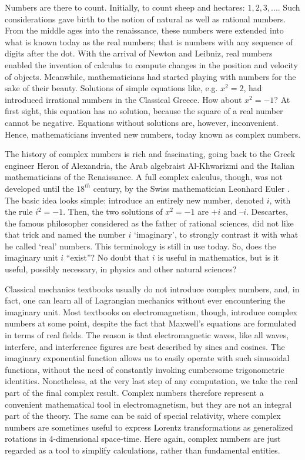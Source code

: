 \documentclass[onecolumn,prx,amsmath,amssymb,12pt]{revtex4-2}
\begin{document}
\newpage

Numbers are there to count. Initially, to count sheep and hectares: $1,2,3,...$. Such considerations gave birth to the notion of natural as well as rational numbers. From the middle ages into the renaissance, these numbers were extended into what is known today as the real numbers; that is numbers with any sequence of digits after the dot. With the arrival of Newton and Leibniz, real numbers enabled the invention of calculus to compute changes in the position and velocity of objects. Meanwhile, mathematicians had started playing with numbers for the sake of their beauty. Solutions of simple equations like, e.g. $x^2=2$, had introduced irrational numbers in the Classical Greece. How about $x^2=-1$? At first sight, this equation has no solution, because the square of a real number cannot be negative. Equations without solutions are, however, inconvenient. Hence, mathematicians invented new numbers, today known as complex numbers.

The history of complex numbers is rich and fascinating, going back to the Greek engineer Heron of Alexandria, the Arab algebraist Al-Khwarizmi and the Italian mathematicians of the Renaissance. A full complex calculus, though, was not developed until the $18^{th}$ century, by the Swiss mathematician Leonhard Euler \cite{complex_numbers}. The basic idea looks simple: introduce an entirely new number, denoted $i$, with the rule $i^2=-1$. Then, the two solutions of $x^2=-1$ are $+i$ and $–i$. Descartes, the famous philosopher considered as the father of rational sciences, did not like that trick and named the number $i$ `imaginary', to strongly contrast it with what he called `real' numbers. This terminology is still in use today. 
So, does the imaginary unit $i$ ``exist''? No doubt that $i$ is useful in mathematics, but is it useful, possibly necessary, in physics and other natural sciences?

Classical mechanics textbooks usually do not introduce complex numbers, and, in fact, one can learn all of Lagrangian mechanics without ever encountering the imaginary unit. Most textbooks on electromagnetism, though, introduce complex numbers at some point, despite the fact that Maxwell's equations are formulated in terms of real fields. The reason is that electromagnetic waves, like all waves, interfere, and interference figures are best described by sines and cosines. The imaginary exponential function allows us to easily operate with such sinusoidal functions, without the need of constantly invoking cumbersome trigonometric identities. Nonetheless, at the very last step of any computation, we take the real part of the final complex result. Complex numbers therefore represent a convenient mathematical tool in electromagnetism, but they are not an integral part of the theory.
The same can be said of special relativity, where complex numbers are sometimes useful to express Lorentz transformations as generalized rotations in 4-dimensional space-time. Here again, complex numbers are just regarded as a tool to simplify calculations, rather than fundamental entities.
\end{document}
